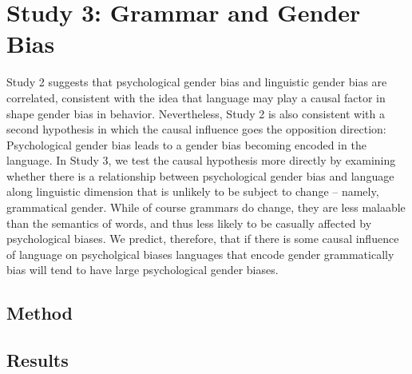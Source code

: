 \documentclass[10pt, letterpaper]{article}
\begin{document}
\section{Study 3: Grammar and Gender
Bias}\label{study-3-grammar-and-gender-bias}

Study 2 suggests that psychological gender bias and linguistic gender
bias are correlated, consistent with the idea that language may play a
causal factor in shape gender bias in behavior. Nevertheless, Study 2 is
also consistent with a second hypothesis in which the causal influence
goes the opposition direction: Psychological gender bias leads to a
gender bias becoming encoded in the language. In Study 3, we test the
causal hypothesis more directly by examining whether there is a
relationship between psychological gender bias and language along
linguistic dimension that is unlikely to be subject to change -- namely,
grammatical gender. While of course grammars do change, they are less
malaable than the semantics of words, and thus less likely to be
casually affected by psychological biases. We predict, therefore, that
if there is some causal influence of language on psycholgical biases
languages that encode gender grammatically bias will tend to have large
psychological gender biases.

\subsection{Method}\label{method-3}

\subsection{Results}\label{results-3}
\end{document}
